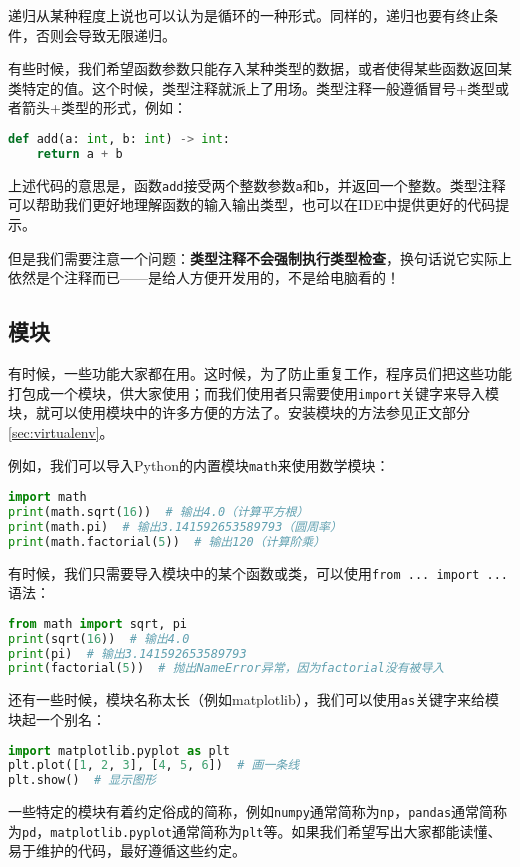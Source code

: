 \documentclass[../main.tex]{subfiles}
\begin{document}
递归从某种程度上说也可以认为是循环的一种形式。同样的，递归也要有终止条件，否则会导致无限递归。

有些时候，我们希望函数参数只能存入某种类型的数据，或者使得某些函数返回某类特定的值。这个时候，类型注释就派上了用场。类型注释一般遵循冒号+类型或者箭头+类型的形式，例如：
\begin{lstlisting}[language=python]
def add(a: int, b: int) -> int:
    return a + b
\end{lstlisting}
上述代码的意思是，函数\texttt{add}接受两个整数参数\texttt{a}和\texttt{b}，并返回一个整数。类型注释可以帮助我们更好地理解函数的输入输出类型，也可以在IDE中提供更好的代码提示。

但是我们需要注意一个问题：\textbf{类型注释不会强制执行类型检查}，换句话说它实际上依然是个注释而已——是给人方便开发用的，不是给电脑看的！

\subsection{模块}
有时候，一些功能大家都在用。这时候，为了防止重复工作，程序员们把这些功能打包成一个模块，供大家使用；而我们使用者只需要使用\texttt{import}关键字来导入模块，就可以使用模块中的许多方便的方法了。安装模块的方法参见正文部分\ref{sec:virtualenv}。

例如，我们可以导入Python的内置模块\texttt{math}来使用数学模块：
\begin{lstlisting}[language=python]
import math
print(math.sqrt(16))  # 输出4.0（计算平方根）
print(math.pi)  # 输出3.141592653589793（圆周率）
print(math.factorial(5))  # 输出120（计算阶乘）
\end{lstlisting}

有时候，我们只需要导入模块中的某个函数或类，可以使用\texttt{from ... import ...}语法：
\begin{lstlisting}[language=python]
from math import sqrt, pi
print(sqrt(16))  # 输出4.0
print(pi)  # 输出3.141592653589793
print(factorial(5))  # 抛出NameError异常，因为factorial没有被导入
\end{lstlisting}

还有一些时候，模块名称太长（例如matplotlib），我们可以使用\texttt{as}关键字来给模块起一个别名：
\begin{lstlisting}[language=python]
import matplotlib.pyplot as plt
plt.plot([1, 2, 3], [4, 5, 6])  # 画一条线
plt.show()  # 显示图形
\end{lstlisting}

一些特定的模块有着约定俗成的简称，例如\texttt{numpy}通常简称为\texttt{np}，\texttt{pandas}通常简称为\texttt{pd}，\texttt{matplotlib.pyplot}通常简称为\texttt{plt}等。如果我们希望写出大家都能读懂、易于维护的代码，最好遵循这些约定。
\end{document}
